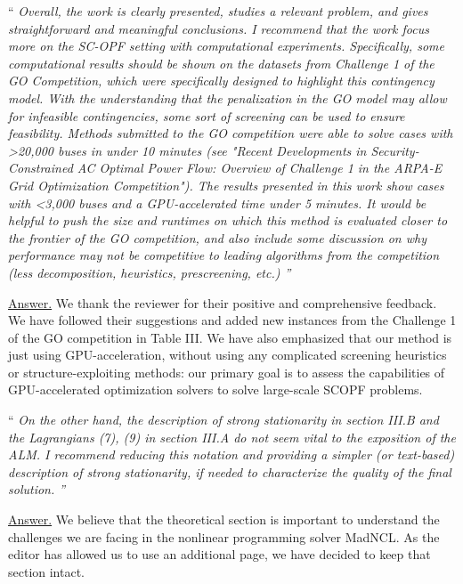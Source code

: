 \documentclass[10pt,a4paper]{article}
\newenvironment{quotereviewer}{\vspace{.5cm}{\underline\reviewername} ``\it\footnotesize}{''}
\newcommand{\answer}{\vspace{1mm}\underline{Answer.} }
\begin{document}
\begin{quotereviewer}
 Overall, the work is clearly presented, studies a relevant problem, and gives straightforward and meaningful conclusions. I recommend that the work focus more on the SC-OPF setting with computational experiments. Specifically, some computational results should be shown on the datasets from Challenge 1 of the GO Competition, which were specifically designed to highlight this contingency model. With the understanding that the penalization in the GO model may allow for infeasible contingencies, some sort of screening can be used to ensure feasibility. Methods submitted to the GO competition were able to solve cases with >20,000 buses in under 10 minutes (see "Recent Developments in Security-Constrained AC Optimal Power Flow: Overview of Challenge 1 in the ARPA-E Grid Optimization Competition"). The results presented in this work show cases with <3,000 buses and a GPU-accelerated time under 5 minutes. It would be helpful to push the size and runtimes on which this method is evaluated closer to the frontier of the GO competition, and also include some discussion on why performance may not be competitive to leading algorithms from the competition (less decomposition, heuristics, prescreening, etc.)
\end{quotereviewer}

\answer
We thank the reviewer for their positive and comprehensive feedback.
We have followed their suggestions and added new instances from the
Challenge 1 of the GO competition in Table III.
We have also emphasized that our method is just using GPU-acceleration, without
using any complicated screening heuristics or structure-exploiting methods:
our primary goal is to assess the capabilities of GPU-accelerated optimization solvers to solve large-scale SCOPF problems.

\begin{quotereviewer}
 On the other hand, the description of strong stationarity in section III.B and the Lagrangians (7), (9) in section III.A do not seem vital to the exposition of the ALM. I recommend reducing this notation and providing a simpler (or text-based) description of strong stationarity, if needed to characterize the quality of the final solution.
\end{quotereviewer}

\answer
We believe that the theoretical section is important to understand the challenges we are facing
in the nonlinear programming solver MadNCL. As the editor has allowed us to use
an additional page, we have decided to keep that section intact.
\end{document}
